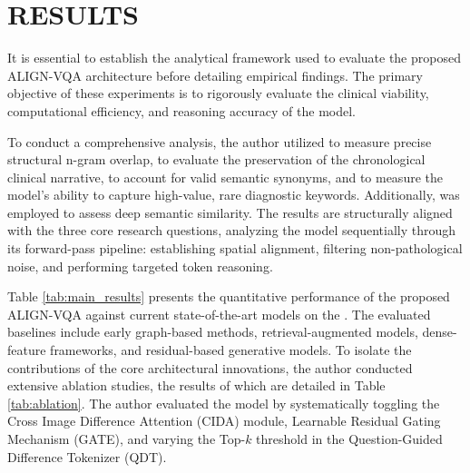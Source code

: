 \setlength{\footskip}{8mm}

\chapter{RESULTS}
	
It is essential to establish the analytical framework used to evaluate the proposed ALIGN-VQA architecture before detailing empirical findings. The primary objective of these experiments is to rigorously evaluate the clinical viability, computational efficiency, and reasoning accuracy of the model.

To conduct a comprehensive analysis, the author utilized \cite{bleu} to measure precise structural n-gram overlap, \cite{rouge} to evaluate the preservation of the chronological clinical narrative, \cite{meteor} to account for valid semantic synonyms, and \cite{cider} to measure the model’s ability to capture high-value, rare diagnostic keywords. Additionally, \cite{bert-score} was employed to assess deep semantic similarity. The results are structurally aligned with the three core research questions, analyzing the model sequentially through its forward-pass pipeline: establishing spatial alignment, filtering non-pathological noise, and performing targeted token reasoning.

Table \ref{tab:main_results} presents the quantitative performance of the proposed ALIGN-VQA against current state-of-the-art models on the \cite{medical-diff-vqa}. The evaluated baselines include early graph-based methods, retrieval-augmented models, dense-feature frameworks, and residual-based generative models. To isolate the contributions of the core architectural innovations, the author conducted extensive ablation studies, the results of which are detailed in Table \ref{tab:ablation}. The author evaluated the model by systematically toggling the Cross Image Difference Attention (CIDA) module, Learnable Residual Gating Mechanism (GATE), and varying the Top-$k$ threshold in the Question-Guided Difference Tokenizer (QDT).

